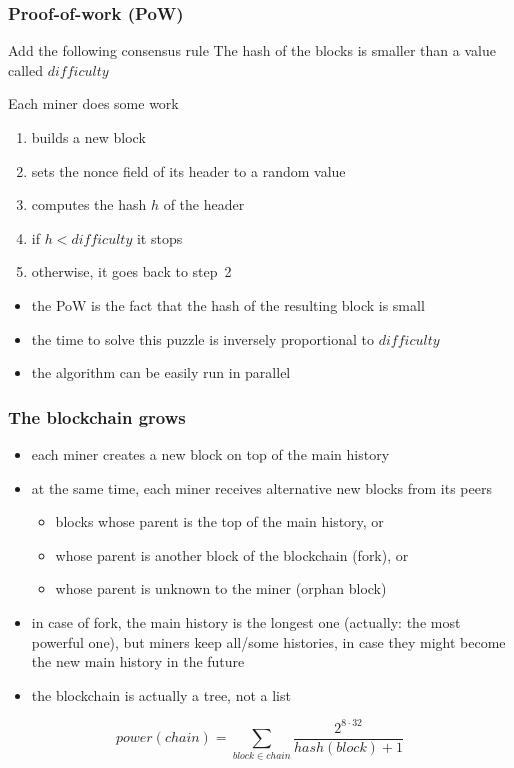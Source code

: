 \documentclass[11pt]{beamer}  %
\begin{document}
\begin{frame}\frametitle{Proof-of-work (PoW)}

  \begin{greenbox}{Add the following consensus rule}
    The hash of the blocks is smaller than
    a value called $\mathit{difficulty}$
  \end{greenbox}

  \bigskip

  \begin{greenbox}{Each miner does some work}
    \begin{enumerate}
    \item builds a new block
    \item sets the nonce field of its header to a random value
    \item computes the hash $h$ of the header
    \item if $h < \mathit{difficulty}$ it stops
    \item otherwise, it goes back to step~2
    \end{enumerate}
  \end{greenbox}

  \bigskip

  \begin{itemize}
  \item the PoW is the fact that the hash of the resulting block is small
  \item the time to solve this puzzle is inversely proportional to $\mathit{difficulty}$
  \item the algorithm can be easily run in parallel
  \end{itemize}

\end{frame}

\begin{frame}\frametitle{The blockchain grows}

  \begin{itemize}
  \item each miner creates a new block on top of the main history
  \item at the same time, each miner receives alternative new blocks from its peers
    \begin{itemize}
    \item blocks whose parent is the top of the main history, or
    \item whose parent is another block of the blockchain (fork), or
    \item whose parent is unknown to the miner (orphan block)
    \end{itemize}
  \item in case of fork, the main history is the longest one (actually: the most powerful one), but miners keep all/some histories,
    in case they might become the new main history in the future
  \item the blockchain is actually a tree, not a list
  \end{itemize}

  \[
  \mathit{power}(\mathit{chain})=\sum_{\mathit{block}\in\mathit{chain}}\frac{2^{8\cdot 32}}{\mathit{hash}(\mathit{block})+1}
  \]
\end{frame}
\end{document}
